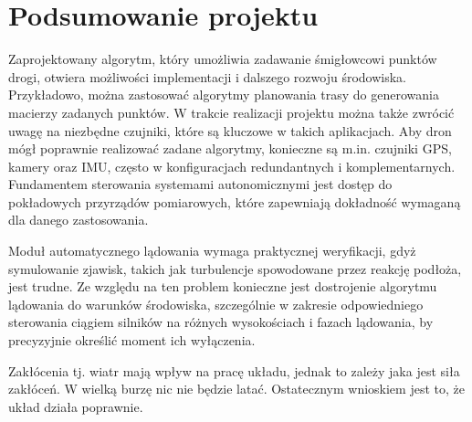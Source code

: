 \documentclass[polish,11pt,a4paper]{article}
\begin{document}
\section*{Podsumowanie projektu}
Zaprojektowany algorytm, który umożliwia zadawanie śmigłowcowi punktów drogi,
otwiera możliwości implementacji i dalszego rozwoju środowiska. Przykładowo,
można zastosować algorytmy planowania trasy do generowania macierzy zadanych
punktów. W trakcie realizacji projektu można także zwrócić uwagę na niezbędne czujniki,
które są kluczowe w takich aplikacjach. Aby dron mógł poprawnie realizować zadane 
algorytmy, konieczne są m.in. czujniki GPS, kamery oraz IMU, często w konfiguracjach
redundantnych i komplementarnych. Fundamentem sterowania systemami
autonomicznymi jest dostęp do pokładowych przyrządów pomiarowych, które zapewniają 
dokładność wymaganą dla danego zastosowania.

Moduł automatycznego lądowania wymaga praktycznej weryfikacji, gdyż symulowanie
zjawisk, takich jak turbulencje spowodowane przez reakcję podłoża, jest trudne.
Ze względu na ten problem konieczne jest dostrojenie algorytmu lądowania do warunków
środowiska, szczególnie w zakresie odpowiedniego sterowania ciągiem silników na różnych
wysokościach i fazach lądowania, by precyzyjnie określić moment ich wyłączenia.

Zakłócenia tj. wiatr mają wpływ na pracę układu, jednak to zależy jaka jest siła zakłóceń. W wielką burzę nic nie będzie latać. Ostatecznym wnioskiem jest to, że układ działa poprawnie. 
\clearpage
\end{document}
